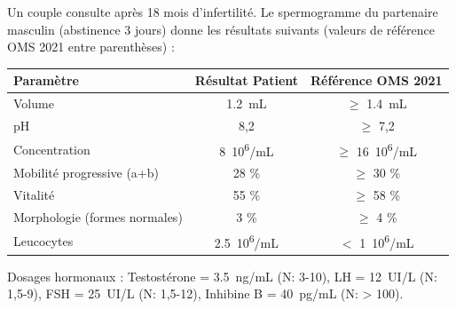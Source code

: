 \documentclass[11pt]{article}
\begin{document}
\begin{exercice}
Un couple consulte après 18 mois d'infertilité. Le spermogramme du partenaire masculin (abstinence 3 jours) donne les résultats suivants (valeurs de référence OMS 2021 entre parenthèses) :

\begin{tabular}{|l|c|c|}
\hline
\textbf{Paramètre} & \textbf{Résultat Patient} & \textbf{Référence OMS 2021} \\
\hline
Volume & \SI{1,2}{mL} & $\ge$ \SI{1,4}{mL} \\
pH & 8,2 & $\ge$ 7,2 \\
Concentration & \SI{8}{10^6/mL} & $\ge$ \SI{16}{10^6/mL} \\
Mobilité progressive (a+b) & 28 \% & $\ge$ 30 \% \\
Vitalité & 55 \% & $\ge$ 58 \% \\
Morphologie (formes normales) & 3 \% & $\ge$ 4 \% \\
Leucocytes & \SI{2,5}{10^6/mL} & $<$ \SI{1}{10^6/mL} \\
\hline
\end{tabular}
Dosages hormonaux : Testostérone = \SI{3,5}{ng/mL} (N: 3-10), LH = \SI{12}{UI/L} (N: 1,5-9), FSH = \SI{25}{UI/L} (N: 1,5-12), Inhibine B = \SI{40}{pg/mL} (N: > 100).


\end{exercice}
\end{document}
